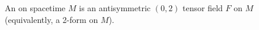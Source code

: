 An  on spacetime $M$ is an antisymmetric $(0,2)$ tensor field $F$ on $M$ (equivalently, a 2-form on $M$).
